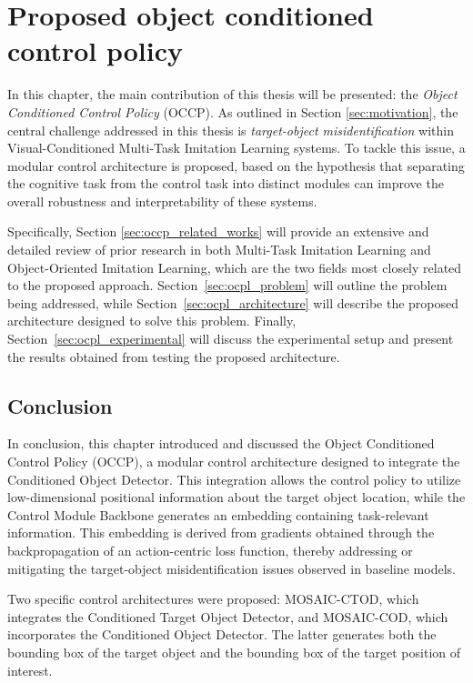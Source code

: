 \chapter{Proposed object conditioned control policy}
\label{ch:occp}
In this chapter, the main contribution of this thesis will be presented: the \textit{Object Conditioned Control Policy} (OCCP). As outlined in Section \ref{sec:motivation}, the central challenge addressed in this thesis is \textit{target-object misidentification} within Visual-Conditioned Multi-Task Imitation Learning systems. To tackle this issue, a modular control architecture is proposed, based on the hypothesis that separating the cognitive task from the control task into distinct modules can improve the overall robustness and interpretability of these systems.

Specifically, Section \ref{sec:occp_related_works} will provide an extensive and detailed review of prior research in both Multi-Task Imitation Learning and Object-Oriented Imitation Learning, which are the two fields most closely related to the proposed approach. Section~\ref{sec:ocpl_problem} will outline the problem being addressed, while Section~\ref{sec:ocpl_architecture} will describe the proposed architecture designed to solve this problem. Finally, Section~\ref{sec:ocpl_experimental} will discuss the experimental setup and present the results obtained from testing the proposed architecture.







\section{Conclusion}
In conclusion, this chapter introduced and discussed the Object Conditioned Control Policy (OCCP), a modular control architecture designed to integrate the Conditioned Object Detector. This integration allows the control policy to utilize low-dimensional positional information about the target object location, while the Control Module Backbone generates an embedding containing task-relevant information. This embedding is derived from gradients obtained through the backpropagation of an action-centric loss function, thereby addressing or mitigating the target-object misidentification issues observed in baseline models.

Two specific control architectures were proposed: MOSAIC-CTOD, which integrates the Conditioned Target Object Detector, and MOSAIC-COD, which incorporates the Conditioned Object Detector. The latter generates both the bounding box of the target object and the bounding box of the target position of interest.

